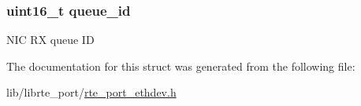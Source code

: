 \subsubsection[{queue\+\_\+id}]{\setlength{\rightskip}{0pt plus 5cm}uint16\+\_\+t queue\+\_\+id}\label{structrte__port__ethdev__reader__params_ad36dd41501a26e3cc7590d1d9a62cdb9}
N\+I\+C R\+X queue I\+D 

The documentation for this struct was generated from the following file\+:\begin{DoxyCompactItemize}
\item 
lib/librte\+\_\+port/\hyperlink{rte__port__ethdev_8h}{rte\+\_\+port\+\_\+ethdev.\+h}\end{DoxyCompactItemize}
